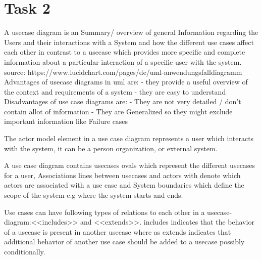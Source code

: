 \chapter{Task 2}
\begin{parlist}
\item A usecase diagram is an Summary/ overview of general Information regarding the Users and their interactions with a System and how the different use cases affect each other in contrast to a usecase which provides more specific and complete information about a particular interaction of a specific user with the system.
source: https://www.lucidchart.com/pages/de/uml-anwendungsfalldiagramm
Advantages of usecase diagrams in uml are:
- they provide a useful overview of the context and requirements of a system
- they are easy to understand
Disadvantages of use case diagrams are:
- They are not very detailed / don't contain allot of information
- They are Generalized so they might exclude important information like Failure cases
\item The actor model element in a use case diagram represents a user which interacts with the system, it can be a person organization, or external system.

\item A use case diagram contains usecases ovals which represent the different usecases for a user, Associations lines between usecases and actors with denote which actors are associated with a use case and System boundaries which define the scope of the system e.g where the system starts and ends.

\item Use cases can have following types of relations to each other in a usecase-diagram:<<includes>>
and <<extends>>. includes indicates that the behavior of a usecase is present in another usecase where as extends indicates that additional behavior of another use case should be added to a usecase possibly conditionally.

\end{parlist}

